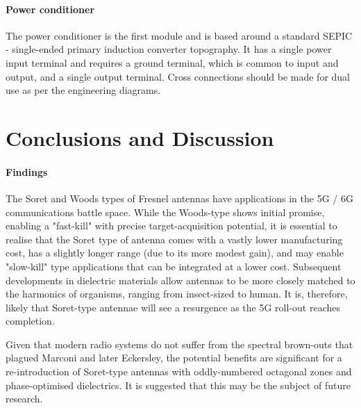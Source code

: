 \documentclass[review]{elsarticle}
\begin{document}
\paragraph{Power conditioner} The power conditioner is the first module and is based around a standard SEPIC - single-ended primary induction converter topography. It has a single power input terminal and requires a ground terminal, which is common to input and output, and a single output terminal. Cross connections should be made for dual use as per the engineering diagrams.

\section{Conclusions and Discussion}
\paragraph{Findings}
The Soret and Woods types of Fresnel antennas have applications in the 5G / 6G communications battle space. While the Woods-type shows initial promise, enabling a "fast-kill" with precise target-acquisition potential, it is essential to realise that the Soret type of antenna comes with a vastly lower manufacturing cost, has a slightly longer range (due to its more modest gain), and may enable "slow-kill" type applications that can be integrated at a lower cost. Subsequent developments in dielectric materials allow antennas to be more closely matched to the harmonics of organisms, ranging from insect-sized to human. It is, therefore, likely that Soret-type antennae will see a resurgence as the 5G roll-out reaches completion. 

Given that modern radio systems do not suffer from the spectral brown-outs that plagued Marconi and later Eckersley, the potential benefits are significant for a re-introduction of Soret-type antennas with oddly-numbered octagonal zones and phase-optimised dielectrics. It is suggested that this may be the subject of future research.


\end{document}
